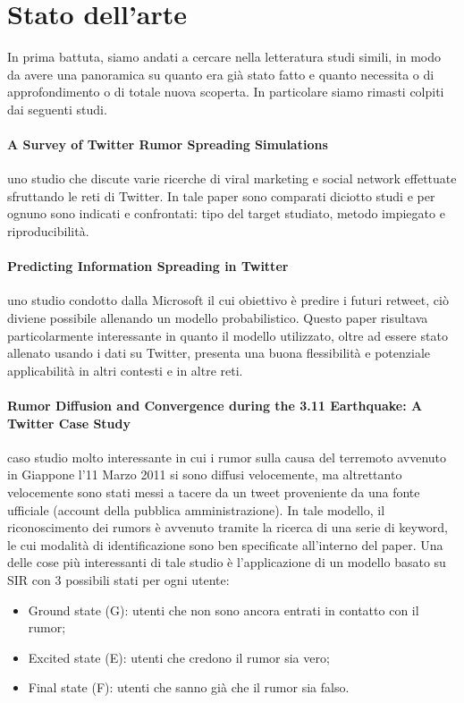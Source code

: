 \section{Stato dell'arte}
    In prima battuta, siamo andati a cercare nella letteratura studi simili, in modo da avere una panoramica su quanto era già stato fatto e quanto necessita o di approfondimento o di totale nuova scoperta.
    In particolare siamo rimasti colpiti dai seguenti studi.
    
    \paragraph{A Survey of Twitter Rumor Spreading Simulations\cite{Paper1_Survey}} 
    uno studio che discute varie ricerche di viral marketing e social network effettuate sfruttando le reti di Twitter. In tale paper sono comparati diciotto studi e per ognuno sono indicati e confrontati: tipo del target studiato, metodo impiegato e riproducibilità.
    
    \paragraph{Predicting Information Spreading in Twitter\cite{Paper2_Predicting}} 
    uno studio condotto dalla Microsoft il cui obiettivo è predire i futuri retweet, ciò diviene possibile allenando un modello probabilistico. Questo paper risultava particolarmente interessante in quanto il modello utilizzato, oltre ad essere stato allenato usando i dati su Twitter, presenta una buona flessibilità e potenziale applicabilità in altri contesti e in altre reti.
    
    \paragraph{Rumor Diffusion and Convergence during the 3.11 Earthquake: A Twitter Case Study\cite{Paper3_Earthquake}}
    caso studio molto interessante in cui i rumor sulla causa del terremoto avvenuto in Giappone l’11 Marzo 2011 si sono diffusi velocemente, ma altrettanto velocemente sono stati messi a tacere da un tweet proveniente da una fonte ufficiale (account della pubblica amministrazione). 
    In tale modello, il riconoscimento dei rumors è avvenuto tramite la ricerca di una serie di keyword, le cui modalità di identificazione sono ben specificate all’interno del paper.
    Una delle cose più interessanti di tale studio è  l’applicazione di un modello  basato su SIR con 3 possibili stati per ogni utente:
    \begin{itemize}
        \item Ground state (G): utenti che non sono ancora entrati in contatto con il rumor;
        \item  Excited state (E): utenti che credono il rumor sia vero;
        \item Final state (F): utenti che sanno già che il rumor sia falso.
    \end{itemize}
    
